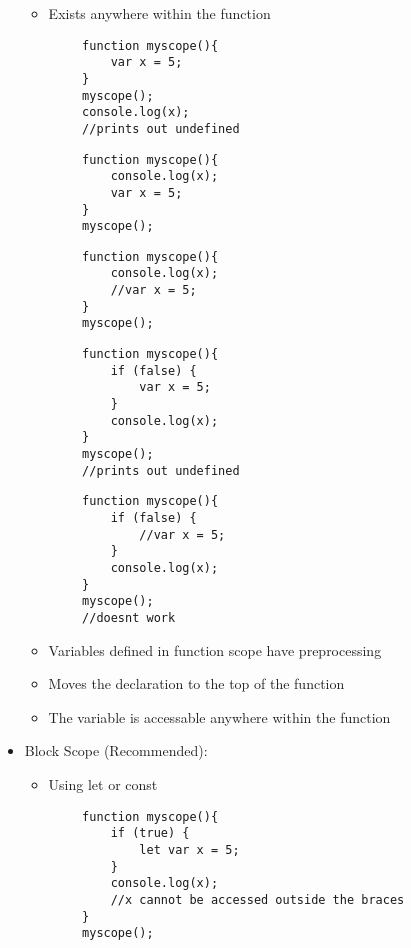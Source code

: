 \documentclass{article}
\begin{document}
\begin{itemize}
    \begin{itemize}
        \item Exists anywhere within the function
    \end{itemize}
    \begin{lstlisting}
        function myscope(){
            var x = 5;
        }
        myscope();
        console.log(x);
        //prints out undefined
    \end{lstlisting}
    \begin{lstlisting}
        function myscope(){
            console.log(x);
            var x = 5;
        }
        myscope();
    \end{lstlisting}
    \begin{lstlisting}
        function myscope(){
            console.log(x);
            //var x = 5;
        }
        myscope();
    \end{lstlisting}
    \begin{lstlisting}
        function myscope(){
            if (false) {
                var x = 5;
            }
            console.log(x);
        }
        myscope();
        //prints out undefined
    \end{lstlisting}
    \begin{lstlisting}
        function myscope(){
            if (false) {
                //var x = 5;
            }
            console.log(x);
        }
        myscope();
        //doesnt work
    \end{lstlisting}
    \begin{itemize}
        \item Variables defined in function scope have preprocessing 
        \item Moves the declaration to the top of the function
        \item The variable is accessable anywhere within the function
    \end{itemize}
    \item Block Scope (Recommended):
    \begin{itemize}
        \item Using let or const
    \end{itemize}
    \begin{lstlisting}
        function myscope(){
            if (true) {
                let var x = 5;
            }
            console.log(x);
            //x cannot be accessed outside the braces 
        }
        myscope();
    \end{lstlisting}
    \begin{itemize}

\end{itemize}
\end{itemize}
\end{document}
